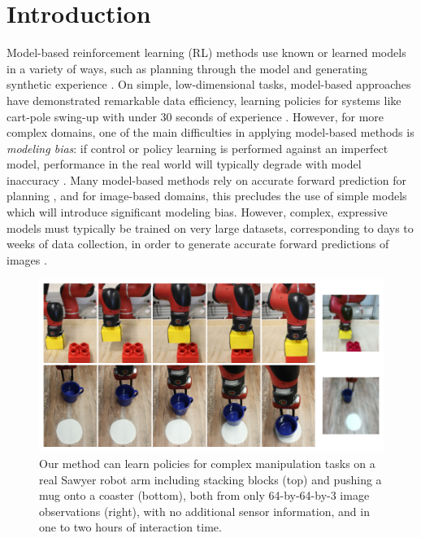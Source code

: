 \section{Introduction}
\label{sec:intro}

Model-based reinforcement learning (RL) methods use known or learned models in a variety of ways, such as planning through the model and generating synthetic experience \citep{dyna,rl-robotics-survey}. On simple, low-dimensional tasks, model-based approaches have demonstrated remarkable data efficiency, learning policies for systems like cart-pole swing-up with under 30 seconds of experience \citep{pilco,ode}. However, for more complex domains, one of the main difficulties in applying model-based methods is \emph{modeling bias}: if control or policy learning is performed against an imperfect model, performance in the real world will typically degrade with model inaccuracy \citep{pilco}. Many model-based methods rely on accurate forward prediction for planning \citep{nn-dyn,pets}, and for image-based domains, this precludes the use of simple models which will introduce significant modeling bias. However, complex, expressive models must typically be trained on very large datasets, corresponding to days to weeks of data collection, in order to generate accurate forward predictions of images \citep{dvf,l2g,l2p}.

\begin{figure}
    \centering
    \includegraphics[width=0.9\linewidth]{img/solar/diag.png}
    \caption[Examples of our method's success at solving real world robotics tasks within one to two hours of interaction time]{Our method can learn policies for complex manipulation tasks on a real Sawyer robot arm including stacking blocks (top) and pushing a mug onto a coaster (bottom), both from only \mbox{64-by-64-by-3} image observations (right), with no additional sensor information, and in one to two hours of interaction time.}
    \label{fig:diag}
    \vspace{-.5em}
\end{figure}

